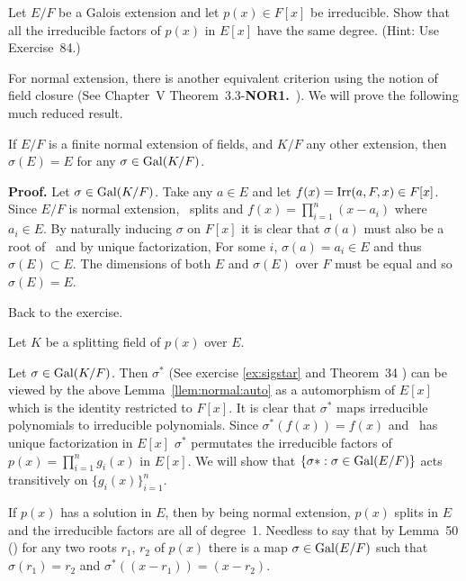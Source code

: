 \begin{myenumerate}
\item
\begin{excopy}
Let \(E/F\) be a Galois extension and let \(p(x)\in F[x]\) be irreducible.
Show that all the irreducible factors of \(p(x)\) in \(E[x]\) have the same
degree.
(Hint: Use Exercise~84.)
\end{excopy}

For normal extension, there is another equivalent criterion
using the notion of field closure
(See Chapter~\textsf{V} Theorem~3.3-\textbf{NOR1.}\ \cite{Lang94}).
We will prove the following much reduced result.

\begin{llem} \label{llem:normal:auto}
If \(E/F\) is a finite normal extension of fields,
and \(K/F\) any other extension,
then \(\sigma(E)=E\) for any \(\sigma\in \mathop{\rm Gal}\nolimits(K/F)\).
\end{llem}
\textbf{Proof.}
Let \(\sigma\in \mathop{\rm Gal}\nolimits(K/F)\).
Take any \(a\in E\) and let \(f(x)=\mathop{\rm Irr}\nolimits(a,F,x)\in F[x]\).
Since \(E/F\) is normal extension, \fx\ splits
and \(f(x)=\prod_{i=1}^n (x-a_i)\) where \(a_i\in E\).
By naturally inducing \(\sigma\) on \(F[x]\) it is clear that
\(\sigma(a)\) must also be a root of \fx\ and by unique factorization,
For some $i$, \(\sigma(a) = a_i \in E\) and thus \(\sigma(E)\subset E\).
The dimensions of both $E$ and \(\sigma(E)\) over $F$ must be equal
and so \(\sigma(E)=E\). \proofend

Back to the exercise.

Let $K$ be a splitting field of \(p(x)\) over $E$.

Let \(\sigma\in \mathop{\rm Gal}\nolimits(K/F)\). Then \(\sigma^*\) (See exercise \ref{ex:sigstar}
and Theorem~34 \cite{Rotman98})
can be viewed by the above Lemma~\ref{llem:normal:auto}
as a automorphism of \(E[x]\) which is the identity restricted to \(F[x]\).
It is clear that \(\sigma^*\) maps irreducible polynomials
to irreducible polynomials. Since \(\sigma^*(f(x))=f(x)\)
and \fx\ has unique factorization in \(E[x]\)
\(\sigma^*\) permutates the irreducible factors of
\(p(x)=\prod_{i=1}^n g_i(x)\) in \(E[x]\).
We will show that \(\{\sigma*: \sigma\in \mathop{\rm Gal}\nolimits(E/F)\}\)
acts transitively on \(\{g_i(x)\}_{i=1}^n\).

If \(p(x)\) has a solution in $E$, then by being normal extension,
\(p(x)\) splits in $E$ and the irreducible factors are all of degree~1.
Needless to say that by Lemma~50 (\cite{Rotman98})
for any two roots \(r_1\), \(r_2\) of \(p(x)\)
there is a map \(\sigma \in \mathop{\rm Gal}\nolimits(E/F)\) such that
\(\sigma(r_1)=r_2\) and \(\sigma^*((x-r_1))=(x-r_2)\).


\end{myenumerate}
